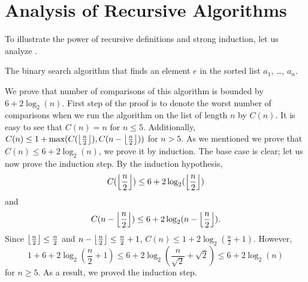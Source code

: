\section{Analysis of Recursive Algorithms}
To illustrate the power of recursive definitions and strong induction, let us
analyze .
\begin{algorithm}
  \begin{algorithmic}[1]
            \State{}
          \EndIf
        \EndFor
      \Else
          \State{}
        \Else
          \State{}
        \EndIf
      \EndIf
    \EndFunction
  \end{algorithmic}
  \caption{The binary search algorithm that finds an element $e$ in the sorted
    list $a_1$, \dots, $a_n$.}
  \label{algorithm:binary-search}
\end{algorithm}
We prove that number of comparisons of this algorithm is bounded by
$6 + 2\log_2(n)$. First step of the proof is to denote the worst
number of comparisons when we run the algorithm on the list of length $n$ by
$C(n)$. It is easy to see that $C(n) = n$ for $n \le 5$. Additionally,
$C(n) \le 1 + \max(C(\left\lfloor {\frac{n}{2}} \right\rfloor), C(n - \left\lfloor {\frac{n}{2}} \right\rfloor))$ for
$n > 5$. As we mentioned we prove that $C(n) \le 6 + 2\log_2(n)$, we prove it
by induction. The base case is clear; let us now prove the induction step.
By the induction hypothesis,
\[
  C(\left\lfloor {\frac{n}{2}} \right\rfloor) \le 6 + 2\log_2(\left\lfloor {\frac{n}{2}} \right\rfloor)
\]
and
\[
  C(n - \left\lfloor {\frac{n}{2}} \right\rfloor) \le 6 + 2\log_2(n - \left\lfloor {\frac{n}{2}} \right\rfloor).
\]
Since $\left\lfloor {\frac{n}{2}} \right\rfloor \le \frac{n}{2}$ and $n - \left\lfloor {\frac{n}{2}} \right\rfloor \le
\frac{n}{2} + 1$, $C(n) \le 1 + 2\log_2(\frac{n}{2} + 1)$.
However,
\[
  1 + 6 + 2\log_2\left(\frac{n}{2} + 1\right) \le
  6 + 2\log_2\left(\frac{n}{\sqrt{2}} + \sqrt{2}\right) \le 6 + 2 \log_2(n)
\]
for $n \ge 5$. As a result, we proved the induction step.

